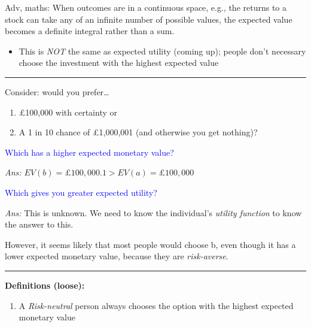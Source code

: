 \documentclass[]{article}
\providecommand{\tightlist}{%
  \setlength{\itemsep}{0pt}\setlength{\parskip}{0pt}}
\begin{document}
\textcolor{RawSienna}{Adv, maths: When outcomes are in a continuous space, e.g., the returns to a stock can take any of an infinite number of possible values, the expected value becomes a definite integral rather than a sum.}

\begin{itemize}
\tightlist
\item
  This is \emph{NOT} the same as expected utility (coming up); people don't necessary choose the investment with the highest expected value
\end{itemize}

\begin{center}\rule{0.5\linewidth}{\linethickness}\end{center}

Consider: would you prefer\ldots{}

\begin{enumerate}
\def\labelenumi{\alph{enumi}.}
\tightlist
\item
  \pounds 100,000 with certainty or
\item
  A 1 in 10 chance of \pounds 1,000,001 (and otherwise you get nothing)?
\end{enumerate}

\textcolor{blue}{Which has a higher expected monetary value?}

\emph{Ans: \(EV(b)=\pounds 100,000.1>EV(a)=\pounds 100,000\)}

\bigskip

\textcolor{blue}{Which gives you greater expected utility?}

\emph{Ans:} This is unknown. We need to know the individual's \emph{utility function} to know the answer to this.

However, it seems likely that most people would choose b, even though it has a lower expected monetary value, because they are \emph{risk-averse}.

\begin{center}\rule{0.5\linewidth}{\linethickness}\end{center}

\textbf{Definitions (loose):}

\begin{enumerate}
\def\labelenumi{\arabic{enumi}.}
\tightlist
\item
  A \emph{Risk-neutral} person always chooses the option with the highest expected monetary value
\end{enumerate}

\bigskip
\end{document}
